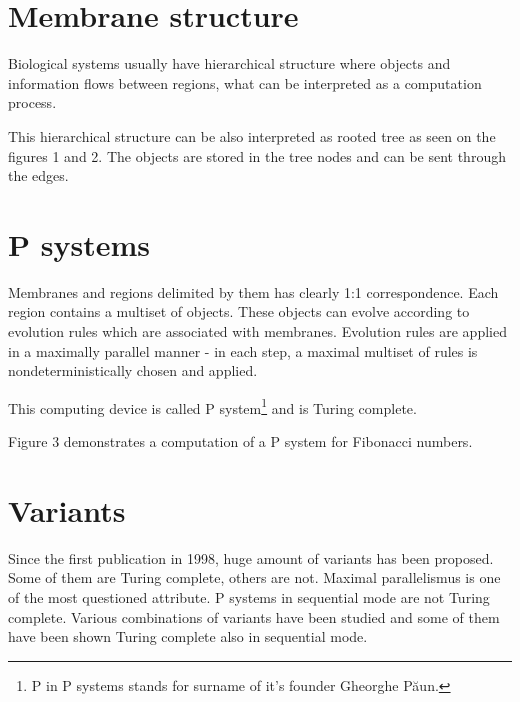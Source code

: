 \documentclass[myposter,portrait]{sciposter}
\def\mysection#1{
{\color{sectionCol}\section*{\sc\bfseries #1}}}
\begin{document}
\begin{multicols*}{3}
\vspace{10mm}

\mysection{Membrane structure}
Biological systems usually have hierarchical structure where objects and information flows between regions, what can be interpreted as a computation process.

This hierarchical structure can be also interpreted as rooted tree as seen on the figures 1 and 2. The objects are stored in the tree nodes and can be sent through the edges.

\mysection{P systems}

Membranes and regions delimited by them has clearly 1:1 correspondence. Each region contains a multiset of objects. These objects can evolve according to evolution rules which are associated with membranes. Evolution rules are applied in a maximally parallel manner - in each step, a maximal multiset of rules is nondeterministically chosen and applied.

This computing device is called P system\footnote{P in P systems stands for surname of it's founder Gheorghe P\u aun.} and is Turing complete.

Figure 3 demonstrates a computation of a P system for Fibonacci numbers.

\mysection{Variants}

Since the first publication in 1998, huge amount of variants has been proposed. Some of them are Turing complete, others are not. Maximal parallelismus is one of the most questioned attribute. P systems in sequential mode are not Turing complete. Various combinations of variants have been studied and some of them have been shown Turing complete also in sequential mode.

\end{multicols*}
\end{document}
